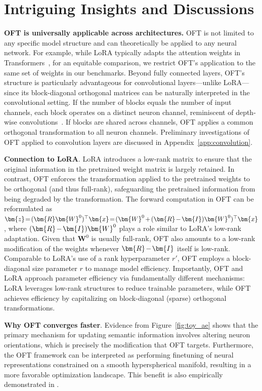 \section{Intriguing Insights and Discussions}

\textbf{OFT is universally applicable across architectures.} OFT is not limited to any specific model structure and can theoretically be applied to any neural network. For example, while LoRA typically adapts the attention weights in Transformers~\cite{hulora2022}, for an equitable comparison, we restrict OFT’s application to the same set of weights in our benchmarks. Beyond fully connected layers, OFT’s structure is particularly advantageous for convolutional layers—unlike LoRA—since its block-diagonal orthogonal matrices can be naturally interpreted in the convolutional setting. If the number of blocks equals the number of input channels, each block operates on a distinct neuron channel, reminiscent of depth-wise convolutions~\cite{chollet2017xception}. If blocks are shared across channels, OFT applies a common orthogonal transformation to all neuron channels. Preliminary investigations of OFT applied to convolution layers are discussed in Appendix~\ref{app:convolution}.

\textbf{Connection to LoRA}. LoRA introduces a low-rank matrix to ensure that the original information in the pretrained weight matrix is largely retained. In contrast, OFT enforces the transformation applied to the pretrained weights to be orthogonal (and thus full-rank), safeguarding the pretrained information from being degraded by the transformation. The forward computation in OFT can be reformulated as $\thickmuskip=2mu \medmuskip=2mu \bm{z}=(\bm{R}\bm{W}^0)^\top\bm{x}=(\bm{W}^0+(\bm{R}-\bm{I})\bm{W}^0)^\top\bm{x}$, where $\thickmuskip=2mu \medmuskip=2mu (\bm{R}-\bm{I})\bm{W}^0$ plays a role similar to LoRA's low-rank adaptation. Given that $\bm{W}^0$ is usually full-rank, OFT also amounts to a low-rank modification of the weights whenever $\thickmuskip=2mu \medmuskip=2mu \bm{R}-\bm{I}$ itself is low-rank. Comparable to LoRA’s use of a rank hyperparameter $r'$, OFT employs a block-diagonal size parameter $r$ to manage model efficiency. Importantly, OFT and LoRA approach parameter efficiency via fundamentally different mechanisms: LoRA leverages low-rank structures to reduce trainable parameters, while OFT achieves efficiency by capitalizing on block-diagonal (sparse) orthogonal transformations.

\textbf{Why OFT converges faster}. Evidence from Figure~\ref{fig:toy_ae} shows that the primary mechanism for updating semantic information involves altering neuron orientations, which is precisely the modification that OFT targets. Furthermore, the OFT framework can be interpreted as performing finetuning of neural representations constrained on a smooth hyperspherical manifold, resulting in a more favorable optimization landscape. This benefit is also empirically demonstrated in \cite{liu2021orthogonal}.

